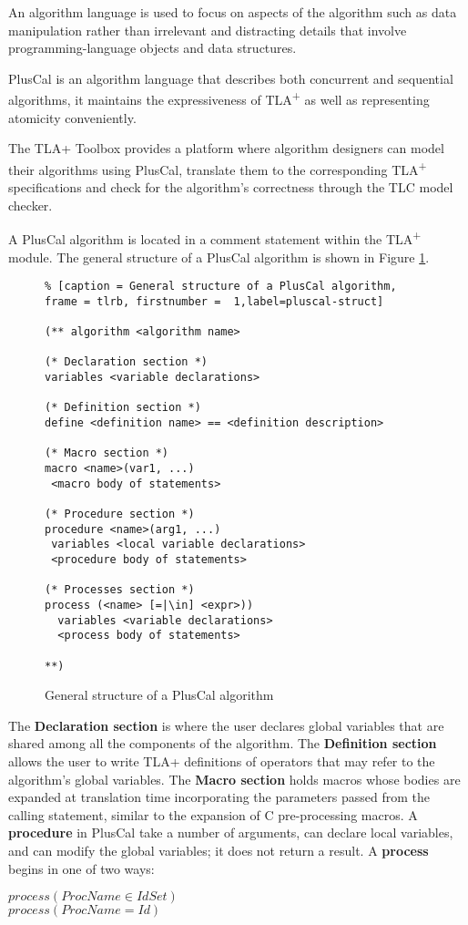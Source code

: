 \documentclass{thesul}
\newcommand{\tlaplus}{TLA\textsuperscript{+}\xspace}
\begin{document}
An algorithm language is used to focus on aspects of the algorithm such as data manipulation rather than irrelevant and distracting details that involve programming-language objects and data structures.

PlusCal is an algorithm language that describes both concurrent and sequential algorithms, it maintains the expressiveness of \tlaplus as well as representing atomicity conveniently.

The TLA+ Toolbox provides a platform where algorithm designers can model their algorithms using PlusCal, translate them to the corresponding \tlaplus specifications and check for the algorithm's correctness through the TLC model checker.

A PlusCal algorithm is located in a comment statement within the \tlaplus module. The general structure of a PlusCal algorithm is shown in Figure \ref{pluscal-struct}.

\begin{figure}[!h]
\begin{lstlisting}% [caption = General structure of a PlusCal algorithm, frame = tlrb, firstnumber =  1,label=pluscal-struct]

(** algorithm <algorithm name>

(* Declaration section *)
variables <variable declarations>

(* Definition section *)
define <definition name> == <definition description>

(* Macro section *)
macro <name>(var1, ...)
 <macro body of statements>

(* Procedure section *)
procedure <name>(arg1, ...)
 variables <local variable declarations>
 <procedure body of statements>

(* Processes section *)
process (<name> [=|\in] <expr>))
  variables <variable declarations>
  <process body of statements>

**)

\end{lstlisting}
\caption{General structure of a PlusCal algorithm}
\label{pluscal-struct}
\end{figure}

The \textbf{Declaration section} is where the user declares global variables that are shared among all the components of the algorithm. The \textbf{Definition section} allows the user to write TLA+ definitions of operators that may refer to the algorithm's global variables.
The \textbf{Macro section} holds macros whose bodies are expanded at translation time incorporating the parameters passed from the calling statement, similar to the expansion of C pre-processing macros. A \textbf{procedure} in PlusCal take a number of arguments, can declare local variables, and can modify the global variables; it does not return a result. A \textbf{process} begins in one of two ways: 
\begin{center}
$process (ProcName \in IdSet)$ \\
$process (ProcName = Id)$
\end{center}
\end{document}
